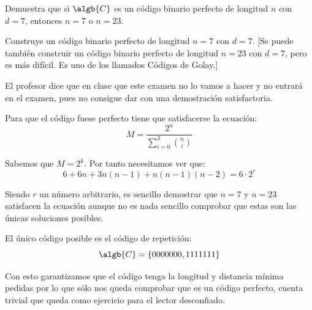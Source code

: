 \begin{problem}[9]
\ppart Demuestra que si $\algb{C}$ es un código binario perfecto de
longitud $n$ con $d=7$, entonces $n=7$ o $n=23$.

\ppart Construye  un código binario perfecto de longitud $n=7$ con
$d=7$. [Se puede también construir  un código binario perfecto de
longitud $n=23$ con $d=7$, pero es más difícil. Es uno de los
llamados Códigos de Golay.]
\solution

\spart

El profesor dice que en clase que este examen no lo vamos a hacer y no entrará en el examen, pues no consigue dar con una demostración satisfactoria.

Para que el código fuese perfecto tiene que satisfacerse la ecuación:
\[M = \frac{2^n}{\sum_{i=0}^3{n \choose i}}\]

Sabemos que $M=2^k$. Por tanto necesitamos ver que:
\[6+6n+3n(n-1)+n(n-1)(n-2) = 6 \cdot 2^r\]

Siendo $r$ un número arbitrario, es sencillo demostrar que $n=7$ y $n=23$ satisfacen la ecuación aunque no es nada sencillo comprobar que estas son las únicas soluciones posibles.

\spart

El único código posible es el código de repetición:
\[\algb{C} = \{0000000,1111111\}\]

Con esto garantizamos que el código tenga la longitud y distancia mínima pedidas por lo que sólo nos queda comprobar que es un código perfecto, cuenta trivial que queda como ejercicio para el lector desconfiado.

\end{problem}

